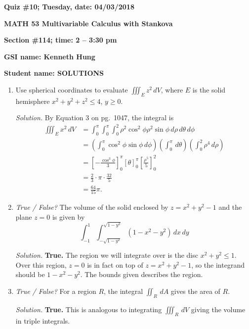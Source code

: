 \documentclass{article}
\begin{document}
{\bf Quiz \#10; Tuesday, date: 04/03/2018}

{\bf MATH 53 Multivariable Calculus with Stankova}

{\bf Section \#114; time: 2 -- 3:30 pm}

{\bf GSI name: Kenneth Hung}

{\bf Student name: SOLUTIONS}

\vspace*{0.25in}

\begin{enumerate}
\item Use spherical coordinates to evaluate $\iiint_E z^2 \,dV$, where $E$ is the solid hemisphere $x^2 + y^2 + z^2 \le 4$, $y \ge 0$.

{\em Solution.} By Equation 3 on pg.\ 1047, the integral is
\begin{align*}
\iiint_E x^2 \,dV & = \int_0^\pi \int_0^\pi \int_0^2 \rho^2 \cos^2 \phi \rho^2 \sin \phi \,d\rho \,d\theta \,d\phi \\
& = \left(\int_0^\pi \cos^2 \phi \sin \phi \,d\phi\right) \left(\int_0^\pi \,d\theta\right) \left(\int_0^2 \rho^4 \,d\rho \right) \\
& = \left[-\frac{\cos^3 \phi}{3}\right]_0^\pi \left[\theta\right]_0^\pi \left[\frac{\rho^5}{5}\right]_0^2 \\
& = \frac{2}{3} \cdot \pi \cdot \frac{32}{5} \\
& = \frac{64}{15} \pi.
\end{align*}

\item {\em True / False?} The volume of the solid enclosed by $z = x^2 + y^2 - 1$ and the plane $z = 0$ is given by
\[
\int_{-1}^1 \int_{-\sqrt{1 - y^2}}^{\sqrt{1 - y^2}} (1 - x^2 - y^2) \,dx \,dy
\]

{\em Solution.} {\bf True.} The region we will integrate over is the disc $x^2 + y^2 \le 1$. Over this region, $z = 0$ is in fact on top of $z = x^2 + y^2 - 1$, so the integrand should be $1 - x^2 - y^2$. The bounds given describes the region.

\item {\em True / False?} For a region $R$, the integral $\iint_R \,dA$ gives the area of $R$.

{\em Solution.} {\bf True.} This is analogous to integrating $\iiint_R \,dV$ giving the volume in triple integrals.
\end{enumerate}
\end{document}
